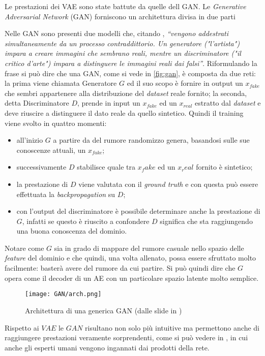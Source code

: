 

Le prestazioni dei VAE sono state battute da quelle dell GAN.
Le \emph{Generative Adversarial Network} (GAN) forniscono un architettura divisa in due parti 

Nelle GAN sono presenti due modelli che, citando \cite{GANTF}, \emph{``vengono addestrati simultaneamente da un processo contraddittorio. Un generatore ("l'artista") impara a creare immagini che sembrano reali, mentre un discriminatore ("il critico d'arte") impara a distinguere le immagini reali dai falsi''}.
Riformulando la frase si può dire che una GAN, come si vede in \autoref{fig:gan}, è composta da due reti: la prima viene chiamata Generatore $G$ ed il suo scopo è fornire in output un $x_{fake}$ che sembri appartenere alla distribuzione del \emph{dataset} reale fornito; la seconda, detta Discriminatore $D$, prende in input un $x_{fake}$ ed un $x_{real}$ estratto dal \emph{dataset} e deve riuscire a distinguere il dato reale da quello sintetico.
Quindi il training viene svolto in quattro momenti:
\begin{itemize}
  \item all'inizio $G$ a partire da del rumore randomizzo genera, basandosi sulle sue conoscenze attuali, un $x_{fake}$;
  \item successivamente $D$ stabilisce quale tra $x_fake$ ed un $x_real$ fornito è sintetico;
  \item la prestazione di $D$ viene valutata con il \emph{ground truth} e con questa può essere effettuata la \emph{backpropagation} su $D$;
  \item con l'output del discriminatore è possibile determinare anche la prestazione di $G$, infatti se questo è riuscito a confondere $D$ significa che sta raggiungendo una buona conoscenza del dominio.
\end{itemize}
Notare come $G$ sia in grado di mappare del rumore casuale nello spazio delle \emph{feature} del dominio e che quindi, una volta allenato, possa essere sfruttato molto facilmente: basterà avere del rumore da cui partire.
Si può quindi dire che $G$ opera come il decoder di un AE con un particolare spazio latente molto semplice.
\begin{figure}[ht]
  \centering
  \texttt{[image: GAN/arch.png]}
  \caption{Architettura di una generica GAN (dalle slide in \cite{MIT_GEN})}
  \label{fig:gan}
\end{figure}
Rispetto ai $VAE$ le $GAN$ risultano non solo più intuitive ma permettono anche di raggiungere prestazioni veramente sorprendenti, come si può vedere in \cite{GAN_HD}, in cui anche gli esperti umani vengono ingannati dai prodotti della rete.


